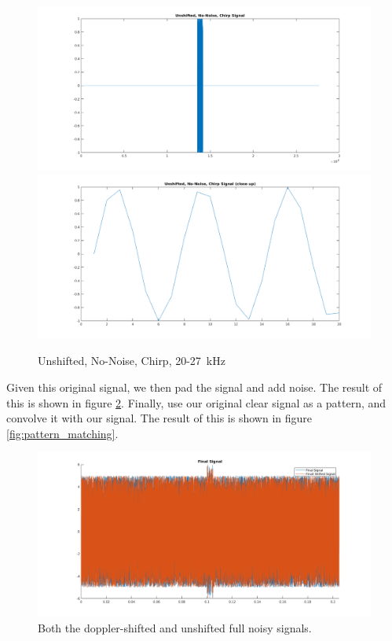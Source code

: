 \documentclass{article}
\begin{document}
    \begin{figure}[H]
      \centering
      \includegraphics[width=1\linewidth]{./images/unshifted_no_noise_chirp.png}
      \includegraphics[width=1\linewidth]{./images/unshifted_no_noise_chirp_zoomed.png}
      \caption{Unshifted, No-Noise, Chirp, 20-27\SI{}{\kilo\hertz}}
      \label{fig:unshifted_no_noise_chirp}
    \end{figure}

    Given this original signal, we then pad the signal and add noise. The result of this is shown in figure \ref{fig:repeated_signal}. Finally, use our original clear signal as a pattern, and convolve it with our signal. The result of this is shown in figure \ref{fig:pattern_matching}.

    \begin{figure}
      \centering
      \includegraphics[width=1\linewidth]{./images/repeated_noisy_signal.png}
      \caption{Both the doppler-shifted and unshifted full noisy signals.}
      \label{fig:repeated_signal}
    \end{figure}
\end{document}
